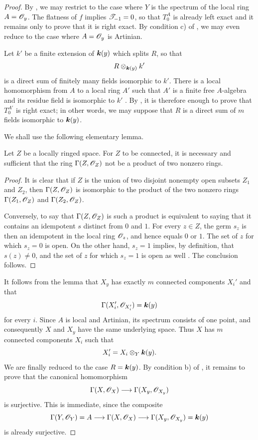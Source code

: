 \begin{proof}
By , we may restrict to the case where
$Y$ is the spectrum of the local ring $A=\mathscr{O}_y$.
The flatness of $f$ implies $\mathscr{T}_{-1}=0$, so that
$T_0^A$ is already left exact and it remains only to prove
that it is right exact.  By condition c) of
, we may even reduce to the case where
$A=\mathscr{O}_y$ is Artinian.

Let $k'$ be a finite extension of $\boldsymbol{k}(y)$ which splits
$R$, so that
\[
  R\otimes_{\boldsymbol{k}(y)}k'
\]
is a direct sum of finitely many fields isomorphic to $k'$.
There is a local homomorphism from $A$ to a local ring
$A'$ such that $A'$ is a finite free $A$-algebra and its
residue field is isomorphic to $k'$ .
By , it is therefore enough to prove that
$T_0^{A'}$ is right exact; in other words, we may suppose
that $R$ is a direct sum of $m$ fields isomorphic to
$\boldsymbol{k}(y)$.

We shall use the following elementary lemma.

\begin{lemma}[7.8.6.1]
\label{III.7.8.6.1}
Let $Z$ be a locally ringed space.  For $Z$ to be connected,
it is necessary and sufficient that the ring
$\Gamma(Z,\mathscr{O}_Z)$ not be a product of two nonzero rings.
\end{lemma}

\begin{proof}
It is clear that if $Z$ is the union of two disjoint
nonempty open subsets $Z_1$ and $Z_2$, then
$\Gamma(Z,\mathscr{O}_Z)$ is isomorphic to the product of the
two nonzero rings $\Gamma(Z_1,\mathscr{O}_Z)$ and
$\Gamma(Z_2,\mathscr{O}_Z)$.

Conversely, to say that $\Gamma(Z,\mathscr{O}_Z)$ is such a
product is equivalent to saying that it contains an
idempotent $s$ distinct from $0$ and $1$.  For every
$z\in Z$, the germ $s_z$ is then an idempotent in the local
ring $\mathscr{O}_z$, and hence equals $0$ or $1$.  The set of
$z$ for which $s_z=0$ is open.  On the other hand,
$s_z=1$ implies, by definition, that $s(z)\ne0$, and the
set of $z$ for which $s_z=1$ is open as well
.  The conclusion follows.
\end{proof}

It follows from the lemma that $X_y$ has exactly $m$
connected components $X_i'$ and that
\[
  \Gamma(X_i',\mathscr{O}_{X_i'})=\boldsymbol{k}(y)
\]
for every $i$.  Since $A$ is local and Artinian, its
spectrum consists of one point, and consequently $X$ and
$X_y$ have the same underlying space.  Thus $X$ has $m$
connected components $X_i$ such that
\[
  X_i'=X_i\otimes_Y\boldsymbol{k}(y).
\]
We are finally reduced to the case $R=\boldsymbol{k}(y)$.  By
condition b) of , it remains to prove that
the canonical homomorphism
\[
  \Gamma(X,\mathscr{O}_X)\longrightarrow
  \Gamma(X_y,\mathscr{O}_{X_y})
\]
is surjective.  This is immediate, since the composite
\[
  \Gamma(Y,\mathscr{O}_Y)=A
  \longrightarrow\Gamma(X,\mathscr{O}_X)
  \longrightarrow\Gamma(X_y,\mathscr{O}_{X_y})=\boldsymbol{k}(y)
\]
is already surjective.
\end{proof}


